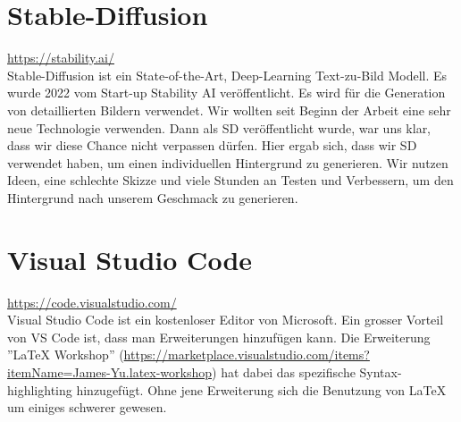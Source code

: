\section{Stable-Diffusion}
\url{https://stability.ai/}\\
Stable-Diffusion ist ein State-of-the-Art, Deep-Learning Text-zu-Bild Modell. Es wurde 2022 vom Start-up Stability AI veröffentlicht. Es wird für die Generation von detaillierten Bildern verwendet. Wir wollten seit
Beginn der Arbeit eine sehr neue Technologie verwenden. Dann als SD veröffentlicht wurde, war uns klar, dass wir diese Chance nicht verpassen dürfen. Hier ergab sich, dass wir SD verwendet haben, um einen individuellen
Hintergrund zu generieren. Wir nutzen Ideen, eine schlechte Skizze und viele Stunden an Testen und Verbessern, um den Hintergrund nach unserem Geschmack zu generieren.

\section{Visual Studio Code}
\url{https://code.visualstudio.com/}\\
Visual Studio Code ist ein kostenloser Editor von Microsoft. Ein grosser Vorteil von VS Code ist, dass man Erweiterungen hinzufügen kann. Die Erweiterung ''LaTeX Workshop'' (\url{https://marketplace.visualstudio.com/items?itemName=James-Yu.latex-workshop})
hat dabei das spezifische Syntax-highlighting hinzugefügt. Ohne jene Erweiterung sich die Benutzung von LaTeX um einiges schwerer gewesen.

